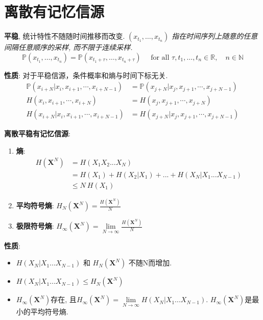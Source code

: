 \documentclass{article}
\newcommand{\env}[2]{\begin{#1}#2\end{#1}}
\newcommand{\defi}[2]{\textbf{#1}, #2}
\newcommand{\bb}{\boldsymbol}
\newcommand{\P}{\mathbb P}
\newcommand{\l}{\left}
\newcommand{\r}{\right}
\begin{document}
    \section{离散有记忆信源}
            
            \defi{平稳}{统计特性不随随时间推移而改变. \textit{$\l(x_{t_1}, \ldots, x_{t_{n}}\r)$ 指在时间序列上随意的任意间隔任意顺序的采样, 而不限于连续采样.}
                \[ \P\l(x_{t_1}, \ldots, x_{t_{n}}\r) = \P\l(x_{t_1+\tau}, \ldots, x_{t_{n}+\tau}\r) \quad \text { for all } \tau, t_1, \ldots, t_{n} \in \mathbb{R}, \quad n \in \mathbb{N}\]
            }
                
                \textbf{性质}: 
                    对于平稳信源，条件概率和熵与时间下标无关.
                    \env{align*}{
                        \P\l(x_{i+N}|x_{i}, x_{i+1}, \cdots, x_{i+N-1}\r) &= \P\l(x_{j+N}|x_{j}, x_{j+1}, \cdots, x_{j+N-1}\r) \tag{条件概率}\\
                        H\l(x_{i}, x_{i+1}, \cdots, x_{i+N}\r) &= H\l(x_{j}, x_{j+1}, \cdots, x_{j+N}\r) \tag{熵}\\
                        H\l(x_{i+N}|x_{i}, x_{i+1}, \cdots, x_{i+N-1}\r) &= H\l(x_{j+N}|x_{j}, x_{j+1}, \cdots, x_{j+N-1}\r) \tag{条件熵}
                    }
                        
            \textbf{离散平稳有记忆信源}:
                \env{enumerate}{
                \item \textbf{熵}:
                    \env{align*}{
                        H(\bb X^N) 
                        &= H(X_1 X_2 ... X_N) \tag{定义}\\
                        &= H(X_1) + H(X_2|X_1) + ... + H(X_N | X_1 ... X_{N-1}) \tag{条件熵展开}\\
                        &\le N\ H(X_1) \tag{熵的不增原理}
                    }
                \item \textbf{平均符号熵}: $H_N(\bb X^N) = \frac{H(\bb X^N)}{N}$
                \item \textbf{极限符号熵}: $H_\infty(\bb X^N) = \lim\limits_{N \to \infty} \frac{H(\bb X^N)}{N}$
                }
                
                \textbf{性质}: 
                    \env{itemize}{
                    \item $H(X_N | X_1 ... X_{N-1})$ 和 $H_N(\bb X^N)$ 不随N而增加.
                    \item $H(X_N | X_1 ... X_{N-1}) \le H_N(\bb X^N)$
                    \item $H_\infty(\bb X^N)$存在, 且$H_\infty(\bb X^N) = \lim\limits_{N \to \infty} H(X_N | X_1 ... X_{N-1})$. $H_\infty(\bb X^N)$是最小的平均符号熵.
                    }
                
\end{document}
